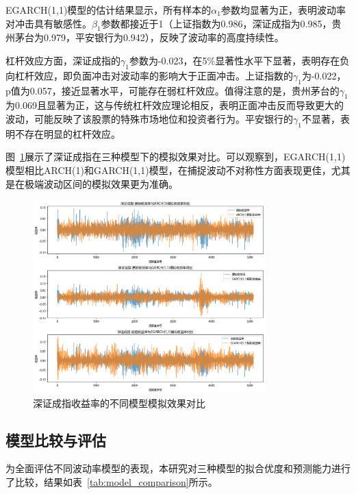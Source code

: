 \documentclass[12pt, a4paper]{article}
\begin{document}
EGARCH(1,1)模型的估计结果显示，所有样本的$\alpha_1$参数均显著为正，表明波动率对冲击具有敏感性。$\beta_1$参数都接近于1（上证指数为0.986，深证成指为0.985，贵州茅台为0.979，平安银行为0.942），反映了波动率的高度持续性。

杠杆效应方面，深证成指的$\gamma_1$参数为-0.023，在5\%显著性水平下显著，表明存在负向杠杆效应，即负面冲击对波动率的影响大于正面冲击。上证指数的$\gamma_1$为-0.022，p值为0.057，接近显著水平，可能存在弱杠杆效应。值得注意的是，贵州茅台的$\gamma_1$为0.069且显著为正，这与传统杠杆效应理论相反，表明正面冲击反而导致更大的波动，可能反映了该股票的特殊市场地位和投资者行为。平安银行的$\gamma_1$不显著，表明不存在明显的杠杆效应。

图~\ref{fig:model_comparison}展示了深证成指在三种模型下的模拟效果对比。可以观察到，EGARCH(1,1)模型相比ARCH(1)和GARCH(1,1)模型，在捕捉波动不对称性方面表现更佳，尤其是在极端波动区间的模拟效果更为准确。

\begin{figure}[htbp]
\centering
\includegraphics[width=0.8\textwidth]{fig/model_comparison.png}
\caption{深证成指收益率的不同模型模拟效果对比}
\label{fig:model_comparison}
\end{figure}

\subsection{模型比较与评估}

为全面评估不同波动率模型的表现，本研究对三种模型的拟合优度和预测能力进行了比较，结果如表~\ref{tab:model_comparison}所示。
\end{document}
